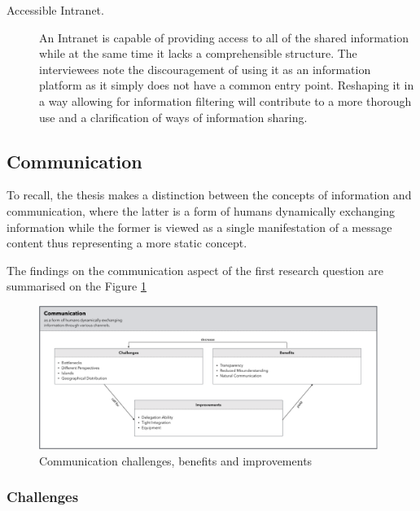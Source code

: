 \begin{description}
   \item[Accessible Intranet.] An Intranet is capable of providing access to all of the shared information while at the same time it lacks a comprehensible structure. The interviewees note the discouragement of using it as an information platform as it simply does not have a common entry point. Reshaping it in a way allowing for information filtering will contribute to a more thorough use and a clarification of ways of information sharing.
   
\end{description}

\subsection{Communication}

To recall, the thesis makes a distinction between the concepts of information and communication, where the latter is a form of humans dynamically exchanging information while the former is viewed as a single manifestation of a message content thus representing a more static concept.

The findings on the communication aspect of the first research question are summarised on the Figure \ref{fig:communication}

\begin{figure}[h!]
  \centering
  \includegraphics[width=0.98\textwidth]{figures/communication.png}
  \caption{Communication challenges, benefits and improvements}
  \label{fig:communication}
\end{figure}


\subsubsection{Challenges}
\label{subsubsection:comm-chall}

